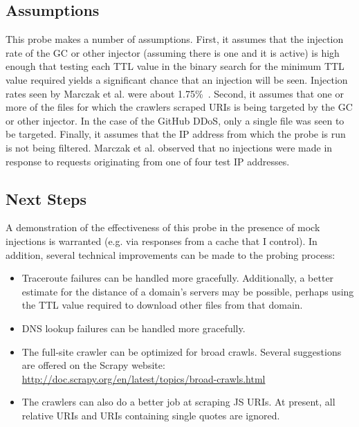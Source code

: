 \subsection{Assumptions}
This probe makes a number of assumptions.
First, it assumes that the injection rate of the GC or other injector (assuming there is one and it is active) is high enough that testing each TTL value in the binary search for the minimum TTL value required yields a significant chance that an injection will be seen.
Injection rates seen by Marczak et al. were about 1.75\%~\cite{Marczak2015}.
Second, it assumes that one or more of the files for which the crawlers scraped URIs is being targeted by the GC or other injector.
In the case of the GitHub DDoS, only a single file was seen to be targeted.
Finally, it assumes that the IP address from which the probe is run is not being filtered.
Marczak et al. observed that no injections were made in response to requests originating from one of four test IP addresses.
\subsection{Next Steps}
A demonstration of the effectiveness of this probe in the presence of mock injections is warranted (e.g. via responses from a cache that I control).
In addition, several technical improvements can be made to the probing process:
\begin{itemize}\addtolength{\itemsep}{-.35\baselineskip}
	\item Traceroute failures can be handled more gracefully.
		Additionally, a better estimate for the distance of a domain's servers may be possible, perhaps using the TTL value required to download other files from that domain.
	\item DNS lookup failures can be handled more gracefully.
	\item The full-site crawler can be optimized for broad crawls.
		Several suggestions are offered on the Scrapy website: \url{http://doc.scrapy.org/en/latest/topics/broad-crawls.html}
	\item The crawlers can also do a better job at scraping JS URIs.
		At present, all relative URIs and URIs containing single quotes are ignored.
\end{itemize}
